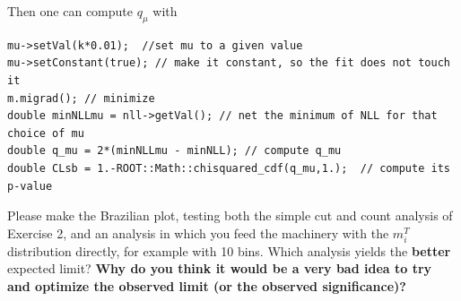 \documentclass[a4paper,12pt]{article}
\begin{document}
Then one can compute $q_\mu$ with
\begin{lstlisting}
mu->setVal(k*0.01);  //set mu to a given value
mu->setConstant(true); // make it constant, so the fit does not touch it
m.migrad(); // minimize
double minNLLmu = nll->getVal(); // net the minimum of NLL for that choice of mu
double q_mu = 2*(minNLLmu - minNLL); // compute q_mu
double CLsb = 1.-ROOT::Math::chisquared_cdf(q_mu,1.);  // compute its p-value 
\end{lstlisting}

Please make the Brazilian plot, testing both the simple cut and count analysis
of Exercise 2, and an analysis in which you feed the machinery with the
$m^T_i$ distribution directly, for example with 10 bins. Which analysis
yields the {\bf better} expected limit? {\bf Why do you think it would be a very
bad idea to try and optimize the observed limit (or the observed
significance)?}
\end{document}
